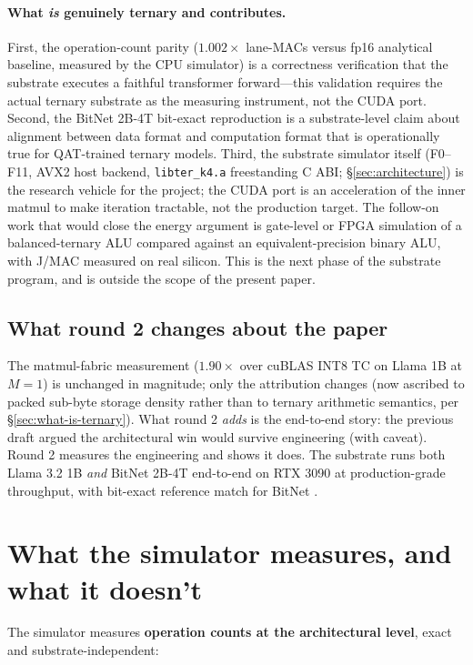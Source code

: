 \documentclass{article}
\begin{document}
\paragraph{What \emph{is} genuinely ternary and contributes.}
First, the operation-count parity ($1.002\times$ lane-{MAC}s versus
fp16 analytical baseline, measured by the {CPU} simulator) is a
correctness verification that the substrate executes a faithful
transformer forward---this validation requires the actual ternary
substrate as the measuring instrument, not the {CUDA} port. Second,
the BitNet 2B-4T bit-exact reproduction is a substrate-level claim
about alignment between data format and computation format that is
operationally true for {QAT}-trained ternary models. Third, the
substrate simulator itself (F0--F11, AVX2 host backend,
\texttt{libter\_k4.a} freestanding {C} ABI; \S\ref{sec:architecture})
is the research vehicle for the project; the {CUDA} port is an
acceleration of the inner matmul to make iteration tractable, not the
production target. The follow-on work that would close the energy
argument is gate-level or {FPGA} simulation of a balanced-ternary
{ALU} compared against an equivalent-precision binary {ALU}, with
J/{MAC} measured on real silicon. This is the next phase of the
substrate program, and is outside the scope of the present paper.

\subsection{What round 2 changes about the paper}

The matmul-fabric measurement ($1.90\times$ over cuBLAS {INT8} {TC}
on Llama 1B at $M=1$) is unchanged in magnitude; only the attribution
changes (now ascribed to packed sub-byte storage density rather than
to ternary arithmetic semantics, per
\S\ref{sec:what-is-ternary}). What round 2 \emph{adds} is the
{end-to-end} story: the previous draft argued the architectural win
would survive engineering (with caveat). Round 2 measures the
engineering and shows it does. The substrate runs both Llama 3.2 1B
\emph{and} BitNet 2B-4T end-to-end on {RTX 3090} at production-grade
throughput, with bit-exact reference match for BitNet
\citep{microsoft-bitnet-cpp}.

\section{What the simulator measures, and what it doesn't}

The simulator measures \textbf{operation counts at the architectural
level}, exact and substrate-independent:
\end{document}
